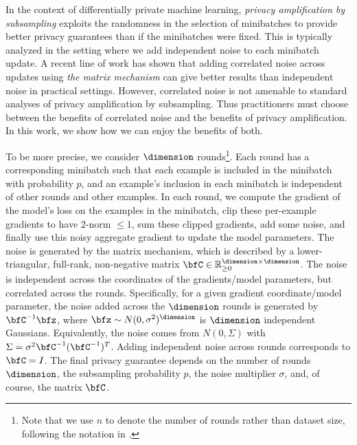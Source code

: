 In the context of differentially private machine learning, \emph{privacy amplification by subsampling} exploits the randomness in the selection of minibatches to provide better privacy guarantees than if the minibatches were fixed.
This is typically analyzed in the setting where we add independent noise to each minibatch update.
A recent line of work has shown that adding correlated noise across updates using \emph{the matrix mechanism} can give better results than independent noise in practical settings.
However, correlated noise is not amenable to standard analyses of privacy amplification by subsampling.
Thus practitioners must choose between the benefits of correlated noise and the benefits of privacy amplification. In this work, we show how we can enjoy the benefits of both.

To be more precise, we consider $\dimension$ rounds\footnote{Note that we use $n$ to denote the number of rounds rather than dataset size, following the notation in \cite{denisovDPMF, MEMF, BandedMF}.}. 
Each round has a corresponding minibatch such that each example is included in the minibatch with probability $p$, and an example's inclusion in each minibatch is independent of other rounds and other examples.  
In each round, we compute the gradient of the model's loss on the examples in the minibatch, clip these per-example gradients to have 2-norm $\le 1$, sum these clipped gradients, add some noise, and finally use this noisy aggregate gradient to update the model parameters.
The noise is generated by the matrix mechanism, which is described by a lower-triangular, full-rank, non-negative matrix $\bfC \in \mathbb{R}_{\geq 0}^{\dimension \times \dimension}$.
The noise is independent across the coordinates of the gradients/model parameters, but correlated across the rounds. Specifically, for a given gradient coordinate/model parameter, the noise added across the $\dimension$ rounds is generated by $\bfC^{-1} \bfz$, where $\bfz \sim N(0, \sigma^2)^\dimension$ is $\dimension$ independent Gaussians.
Equivalently, the noise comes from $N(0,\Sigma)$ with $\Sigma = \sigma^2 \bfC^{-1} (\bfC^{-1})^T$.
Adding independent noise across rounds corresponds to $\bfC=I$.
The final privacy guarantee depends on the number of rounds $\dimension$, the subsampling probability $p$, the noise multiplier $\sigma$, and, of course, the matrix $\bfC$.%

